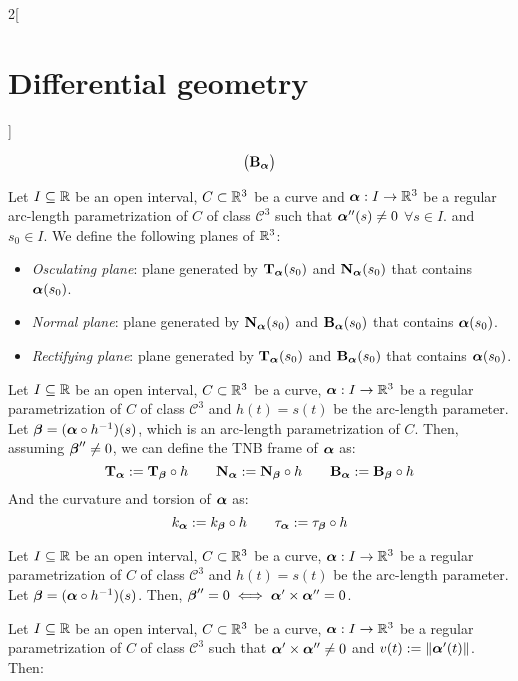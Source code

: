 \documentclass[../../../main_math.tex]{subfiles}
\begin{document}
\begin{multicols}{2}[\section{Differential geometry}]
\begin{theorem}
$$\begin{pmatrix}
        \B\alpha \\
      \end{pmatrix}
    $$
  \end{theorem}
  \begin{definition}
    Let $I\subseteq\RR$ be an open interval, $C\subset\RR^3$ be a curve and $\vf{\alpha}:I\rightarrow\RR^3$ be a regular arc-length parametrization of $C$ of class $\mathcal{C}^3$ such that $\vf{\alpha}''(s)\ne 0$ $\forall s\in I$. and $s_0\in I$. We define the following planes of $\RR^3$:
    \begin{itemize}
      \item \emph{Osculating plane}: plane generated by $\T\alpha(s_0)$ and $\N\alpha(s_0)$ that contains $\vf{\alpha}(s_0)$.
      \item \emph{Normal plane}: plane generated by $\N\alpha(s_0)$ and $\B\alpha(s_0)$ that contains $\vf{\alpha}(s_0)$.
      \item \emph{Rectifying plane}: plane generated by $\T\alpha(s_0)$ and $\B\alpha(s_0)$ that contains $\vf{\alpha}(s_0)$.
    \end{itemize}
  \end{definition}
  \begin{proposition}
    Let $I\subseteq\RR$ be an open interval, $C\subset\RR^3$ be a curve, $\vf{\alpha}:I\rightarrow\RR^3$ be a regular parametrization of $C$ of class $\mathcal{C}^3$ and $h(t)=s(t)$ be the arc-length parameter. Let $\vf{\beta}=(\vf{\alpha}\circ h^{-1})(s)$, which is an arc-length parametrization of $C$. Then, assuming $\vf{\beta}''\ne 0$, we can define the TNB frame of $\vf{\alpha}$ as: $$\T\alpha:=\T\beta\circ h\qquad\N\alpha:=\N\beta\circ h\qquad\B\alpha:=\B\beta\circ h$$
    And the curvature and torsion of $\vf\alpha$ as: $$k_{\vf\alpha}:=k_{\vf\beta}\circ h\qquad\ta\alpha:=\ta\beta\circ h$$
  \end{proposition}
  \begin{lemma}
    Let $I\subseteq\RR$ be an open interval, $C\subset\RR^3$ be a curve, $\vf{\alpha}:I\rightarrow\RR^3$ be a regular parametrization of $C$ of class $\mathcal{C}^3$ and $h(t)=s(t)$ be the arc-length parameter. Let $\vf{\beta}=(\vf{\alpha}\circ h^{-1})(s)$. Then, $\vf{\beta}''=0\iff\vf\alpha'\times\vf\alpha''=0$.
  \end{lemma}
  \begin{lemma}
    Let $I\subseteq\RR$ be an open interval, $C\subset\RR^3$ be a curve, $\vf{\alpha}:I\rightarrow\RR^3$ be a regular parametrization of $C$ of class $\mathcal{C}^3$ such that $\vf{\alpha}'\times \vf{\alpha}''\ne 0$ and $v(t):=\|\vf{\alpha}'(t)\|$. Then:

\end{lemma}
\end{multicols}
\end{document}
